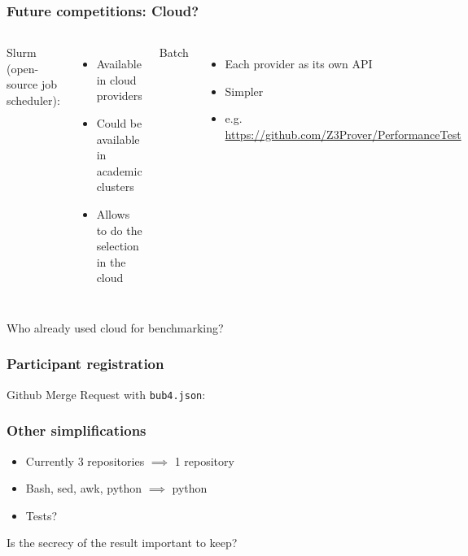 \documentclass[table]{beamer}
\begin{document}







\begin{frame}
    \frametitle{Future competitions: Cloud? \logocloud}
\begin{columns}
    Slurm (open-source job scheduler):
    \begin{itemize}
        \item Available in cloud providers
        \item Could be available in academic clusters
        \item Allows to do the selection in the cloud
    \end{itemize}
    Batch
    \begin{itemize}
        \item Each provider as its own API 
        \item Simpler
        \item e.g. \url{https://github.com/Z3Prover/PerformanceTest}
    \end{itemize}
\end{columns}
    \pause
    \vfill
    \begin{center}
        \large
        Who already used cloud for benchmarking?
    \end{center}
\end{frame}



\begin{frame}
    \frametitle{Participant registration}
    Github Merge Request with \lstinline{bub4.json}:
    
    
\end{frame}


\begin{frame}
    \frametitle{Other simplifications}
    \begin{itemize}
        \item Currently 3 repositories $\implies$ 1 repository
        \item Bash, sed, awk, python $\implies$ python
        \item Tests?
    \end{itemize}
\pause
\vfill
    \begin{center}
        {\large Is the secrecy of the result important to keep?}
    \end{center}
\end{frame}
\end{document}
